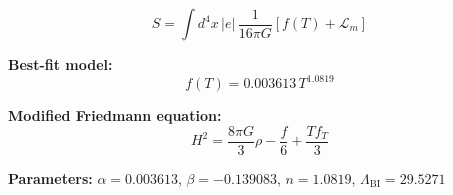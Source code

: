 
\begin{equation}
  S = \int d^4x \, |e| \, \frac{1}{16\pi G} \left[ f(T) + \mathcal{L}_m \right]
\end{equation}

\textbf{Best-fit model:}
\begin{equation}
  f(T) = 0.003613 \, T^{1.0819}
\end{equation}

\textbf{Modified Friedmann equation:}
\begin{equation}
  H^2 = \frac{8\pi G}{3} \rho - \frac{f}{6} + \frac{T f_T}{3}
\end{equation}

\textbf{Parameters:}
$\alpha = 0.003613$, \quad
$\beta = -0.139083$, \quad
$n = 1.0819$, \quad
$\Lambda_{\text{BI}} = 29.5271$